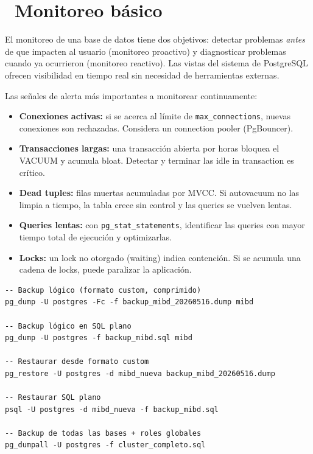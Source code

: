 \section[Monitoreo básico]{~Monitoreo básico}

El monitoreo de una base de datos tiene dos objetivos: detectar problemas \emph{antes} de que impacten al usuario (monitoreo proactivo) y diagnosticar problemas cuando ya ocurrieron (monitoreo reactivo).
Las vistas del sistema de PostgreSQL ofrecen visibilidad en tiempo real sin necesidad de herramientas externas.

Las señales de alerta más importantes a monitorear continuamente:
\begin{itemize}
  \item \textbf{Conexiones activas:} si se acerca al límite de \texttt{max\_connections}, nuevas conexiones son rechazadas. Considera un connection pooler (PgBouncer).
  \item \textbf{Transacciones largas:} una transacción abierta por horas bloquea el VACUUM y acumula bloat. Detectar y terminar las idle in transaction es crítico.
  \item \textbf{Dead tuples:} filas muertas acumuladas por MVCC. Si autovacuum no las limpia a tiempo, la tabla crece sin control y las queries se vuelven lentas.
  \item \textbf{Queries lentas:} con \texttt{pg\_stat\_statements}, identificar las queries con mayor tiempo total de ejecución y optimizarlas.
  \item \textbf{Locks:} un lock no otorgado (waiting) indica contención. Si se acumula una cadena de locks, puede paralizar la aplicación.
\end{itemize}

\begin{lstlisting}[caption={Backups con pg\_dump y restauración}]
-- Backup lógico (formato custom, comprimido)
pg_dump -U postgres -Fc -f backup_mibd_20260516.dump mibd

-- Backup lógico en SQL plano
pg_dump -U postgres -f backup_mibd.sql mibd

-- Restaurar desde formato custom
pg_restore -U postgres -d mibd_nueva backup_mibd_20260516.dump

-- Restaurar SQL plano
psql -U postgres -d mibd_nueva -f backup_mibd.sql

-- Backup de todas las bases + roles globales
pg_dumpall -U postgres -f cluster_completo.sql
\end{lstlisting}

